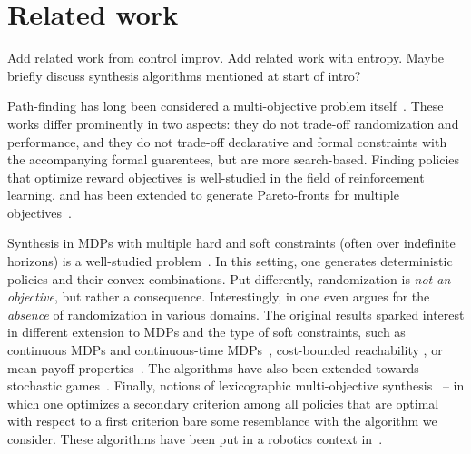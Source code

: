 \section{Related work}
\color{red}
\cite{DBLP:journals/corr/abs-2009-10883}
\cite{DBLP:journals/jcss/BrazdilCFK17}

Add related work from control improv.
Add related work with entropy.
Maybe briefly discuss synthesis algorithms mentioned at start of intro?
\color{black}



Path-finding has long been considered a multi-objective problem itself~\cite{DBLP:conf/icra/AmigoniG05,DBLP:journals/eswa/NazarahariKD19,DBLP:conf/icml/XuTMRSM20}.
These works differ prominently in two aspects: they do not trade-off randomization and performance, and they do not trade-off declarative and formal constraints with the accompanying formal guarentees, but are more search-based. 
Finding policies that optimize reward objectives is well-studied in the field of reinforcement learning, and has been extended to generate Pareto-fronts for multiple objectives~\cite{DBLP:conf/icml/NatarajanT05,DBLP:conf/adprl/ParisiPSBR14}.

Synthesis in MDPs with multiple hard and soft constraints (often over indefinite horizons) is a well-studied problem~\cite{DBLP:conf/stacs/ChatterjeeMH06,DBLP:conf/tacas/EtessamiKVY07,DBLP:conf/atva/ForejtKP12,DBLP:journals/fmsd/RandourRS17}.  In this setting, one generates deterministic policies and their convex combinations. Put differently, randomization is \emph{not an objective}, but rather a consequence. Interestingly, in \cite{DBLP:conf/tacas/DelgrangeKQR20} one even argues for the \emph{absence} of randomization in various domains.  
The original results sparked interest in different extension to MDPs and the type of soft constraints, such as continuous MDPs \cite{DBLP:journals/csysl/HaesaertNS21} and continuous-time MDPs~\cite{DBLP:conf/cav/QuatmannJK17},  cost-bounded reachability \cite{DBLP:journals/jar/HartmannsJKQ20}, or mean-payoff properties~\cite{DBLP:journals/corr/abs-1104-3489}. 
The algorithms have also been extended towards stochastic games~\cite{DBLP:conf/mfcs/ChenFKSW13,DBLP:journals/sttt/KwiatkowskaPW18}.
Finally, notions of lexicographic multi-objective synthesis~\cite{DBLP:conf/cav/ChatterjeeKWW20} -- in which one optimizes a secondary criterion among all policies that are optimal with respect to a first criterion bare some resemblance with the algorithm we consider. 
These algorithms have been put in a robotics context in~\cite{DBLP:journals/ijrr/LacerdaFPH19}.

